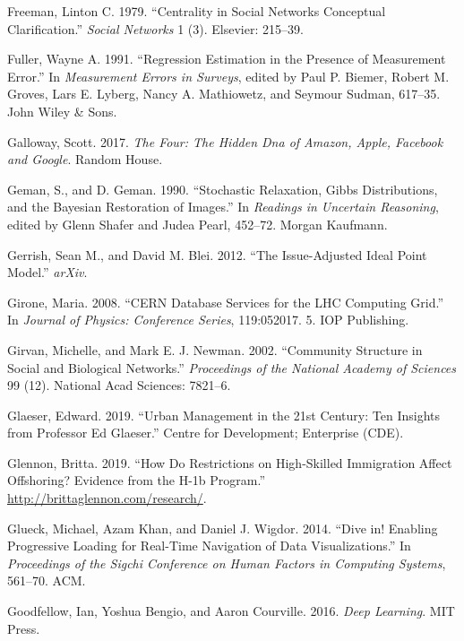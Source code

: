 \documentclass[]{krantz}
\begin{document}
\hypertarget{ref-freeman1979centrality}{}
Freeman, Linton C. 1979. ``Centrality in Social Networks Conceptual
Clarification.'' \emph{Social Networks} 1 (3). Elsevier: 215--39.

\hypertarget{ref-fuller1991regression}{}
Fuller, Wayne A. 1991. ``Regression Estimation in the Presence of
Measurement Error.'' In \emph{Measurement Errors in Surveys}, edited by
Paul P. Biemer, Robert M. Groves, Lars E. Lyberg, Nancy A. Mathiowetz,
and Seymour Sudman, 617--35. John Wiley \& Sons.

\hypertarget{ref-galloway2017four}{}
Galloway, Scott. 2017. \emph{The Four: The Hidden Dna of Amazon, Apple,
Facebook and Google}. Random House.

\hypertarget{ref-geman-90}{}
Geman, S., and D. Geman. 1990. ``Stochastic Relaxation, Gibbs
Distributions, and the Bayesian Restoration of Images.'' In
\emph{Readings in Uncertain Reasoning}, edited by Glenn Shafer and Judea
Pearl, 452--72. Morgan Kaufmann.

\hypertarget{ref-gerrish-12}{}
Gerrish, Sean M., and David M. Blei. 2012. ``The Issue-Adjusted Ideal
Point Model.'' \emph{arXiv}.

\hypertarget{ref-girone2008cern}{}
Girone, Maria. 2008. ``CERN Database Services for the LHC Computing
Grid.'' In \emph{Journal of Physics: Conference Series}, 119:052017. 5.
IOP Publishing.

\hypertarget{ref-girvan2002community}{}
Girvan, Michelle, and Mark E. J. Newman. 2002. ``Community Structure in
Social and Biological Networks.'' \emph{Proceedings of the National
Academy of Sciences} 99 (12). National Acad Sciences: 7821--6.

\hypertarget{ref-glaeser2019urban}{}
Glaeser, Edward. 2019. ``Urban Management in the 21st Century: Ten
Insights from Professor Ed Glaeser.'' Centre for Development; Enterprise
(CDE).

\hypertarget{ref-Glennon2019}{}
Glennon, Britta. 2019. ``How Do Restrictions on High-Skilled Immigration
Affect Offshoring? Evidence from the H-1b Program.''
\url{http://brittaglennon.com/research/}.

\hypertarget{ref-glueck2014dive}{}
Glueck, Michael, Azam Khan, and Daniel J. Wigdor. 2014. ``Dive in!
Enabling Progressive Loading for Real-Time Navigation of Data
Visualizations.'' In \emph{Proceedings of the Sigchi Conference on Human
Factors in Computing Systems}, 561--70. ACM.

\hypertarget{ref-Goodfellow2016}{}
Goodfellow, Ian, Yoshua Bengio, and Aaron Courville. 2016. \emph{Deep
Learning}. MIT Press.
\end{document}
